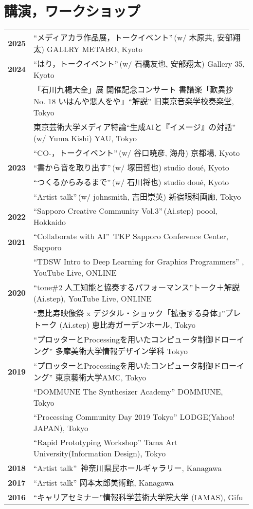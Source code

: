 \documentclass[8pt,a4paper]{article}
\begin{document}
\section*{講演，ワークショップ}

\begin{tabular}{@{}p{1.2cm}@{\hspace{0.5cm}}p{14cm}@{}}
\textbf{2025} & ``メディアカラ作品展，トークイベント''\,(w/ 木原共, 安部翔太) GALLRY METABO, Kyoto \\[0.2em]
\textbf{2024} & ``はり，トークイベント''\,(w/ 石橋友也, 安部翔太) Gallery 35, Kyoto \\
& 「石川九楊大全」展 開催記念コンサート 書譜楽「歎異抄 No. 18 いはんや悪人をや」``解説'' 旧東京音楽学校奏楽堂, Tokyo \\
& 東京芸術大学メディア特論``生成AIと『イメージ』の対話''\,(w/ Yuma Kishi) YAU, Tokyo \\
& ``CO-，トークイベント''\,(w/ 谷口暁彦, 海舟) 京都場, Kyoto \\[0.2em]
\textbf{2023} & ``書から音を取り出す''\,(w/ 塚田哲也) studio doué, Kyoto \\
& ``つくるからみるまで''\,(w/ 石川将也) studio doué, Kyoto \\
& ``Artist talk''\,(w/ johnsmith, 吉田崇英) 新宿眼科画廊, Tokyo \\[0.2em]
\textbf{2022} & ``Sapporo Creative Community Vol.3''\,(Ai.step) poool, Hokkaido \\[0.2em]
\textbf{2021} & ``Collaborate with AI''\, TKP Sapporo Conference Center, Sapporo \\
& ``TDSW Intro to Deep Learning for Graphics Programmers'' , YouTube Live, ONLINE \\[0.2em]
\textbf{2020} & ``tone\#2 人工知能と協奏するパフォーマンス''トーク＋解説 (Ai.step), YouTube Live, ONLINE \\
& ``恵比寿映像祭 x デジタル・ショック「拡張する身体」''プレトーク (Ai.step) 恵比寿ガーデンホール, Tokyo \\
& ``プロッターとProcessingを用いたコンピュータ制御ドローイング'' 多摩美術大学情報デザイン学科 Tokyo \\[0.2em]
\textbf{2019} & ``プロッターとProcessingを用いたコンピュータ制御ドローイング'' 東京藝術大学AMC, Tokyo \\
& ``DOMMUNE The Synthesizer Academy'' DOMMUNE, Tokyo \\
& ``Processing Community Day 2019 Tokyo'' LODGE(Yahoo! JAPAN), Tokyo \\
& ``Rapid Prototyping Workshop'' Tama Art University(Information Design), Tokyo \\[0.2em]
\textbf{2018} & ``Artist talk''\, 神奈川県民ホールギャラリー, Kanagawa \\[0.2em]
\textbf{2017} & ``Artist talk'' 岡本太郎美術館, Kanagawa \\[0.2em]
\textbf{2016} & ``キャリアセミナー''情報科学芸術大学院大学 (IAMAS), Gifu \\
\end{tabular}
\end{document}
